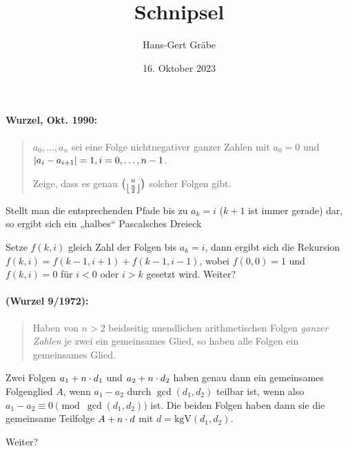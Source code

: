 \documentclass[11pt,a4paper]{article}
\title{Schnipsel}
\author{Hans-Gert Gräbe}
\date{16. Oktober 2023}
\begin{document}
\maketitle
 
\paragraph{Wurzel, Okt. 1990:}
\begin{quote}
  $a_0,\dots, a_n$ sei eine Folge nichtnegativer ganzer Zahlen mit $a_0=0$ und
  $\left\vert a_i-a_{i+1}\right\vert=1, i=0,\dots,n-1$.

  Zeige, dass es genau $\binom{n}{\left\lfloor \frac{n}{2}\right\rfloor}$ solcher Folgen gibt.
\end{quote}
\begin{loesung}
  Stellt man die entsprechenden Pfade bis zu $a_k=i$ ($k+1$ ist immer gerade)
  dar, so ergibt sich ein „halbes“ Pascalsches Dreieck
  
  Setze $f(k,i)$ gleich Zahl der Folgen bis $a_k=i$, dann ergibt sich die
  Rekursion $f(k,i)=f(k-1,i+1)+f(k-1,i-1)$, wobei $f(0,0)=1$ und $f(k,i)=0$
  für $i<0$ oder $i>k$ gesetzt wird. Weiter?  
\end{loesung}

\paragraph{(Wurzel 9/1972):} 
\begin{quote}
  Haben von $n>2$ beidseitig unendlichen arithmetischen Folgen \emph{ganzer
  Zahlen} je zwei ein gemeinsames Glied, so haben alle Folgen ein gemeinsames
  Glied.
\end{quote}
\begin{loesung}
  Zwei Folgen $a_1+n\cdot d_1$ und $a_2+n\cdot d_2$ haben genau dann ein gemeinsames
  Folgenglied $A$, wenn $a_1-a_2$ durch $\gcd(d_1,d_2)$ teilbar ist, wenn also
  $a_1-a_2\equiv 0\pmod{\gcd(d_1,d_2)}$ ist.  Die beiden Folgen haben dann sie
  die gemeinsame Teilfolge $A+n\cdot d$ mit $d=\mathrm{kgV}(d_1,d_2)$.

  Weiter?

\end{loesung}
\end{document}
